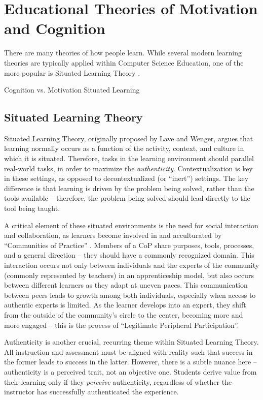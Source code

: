 \section{Educational Theories of Motivation and Cognition}

There are many theories of how people learn. 
While several modern learning theories are typically applied within Computer Science Education, one of the more popular is Situated Learning Theory \cite{ben2004situated}.

Cognition vs. Motivation
Situated Learning


\subsection{Situated Learning Theory}

Situated Learning Theory, originally proposed by Lave and Wenger, argues that learning normally occurs as a function of the activity, context, and culture in which it is situated\cite{lave-situated}.
Therefore, tasks in the learning environment should parallel real-world tasks, in order to maximize the \textit{authenticity}.
Contextualization is key in these settings, as opposed to decontextualized (or ``inert'') settings.
The key difference is that learning is driven by the problem being solved, rather than the tools available – therefore, the problem being solved should lead directly to the tool being taught.

A critical element of these situated environments is the need for social interaction and collaboration, as learners become involved in and acculturated by ``Communities of Practice'' \cite{brown1989situated}.
Members of a CoP share purposes, tools, processes, and a general direction -- they should have a commonly recognized domain. 
This interaction occurs not only between individuals and the experts of the community (commonly represented by teachers) in an apprenticeship model, but also occurs between different learners as they adapt at uneven paces.
This communication between peers leads to growth among both individuals, especially when access to authentic experts is limited.
As the learner develops into an expert, they shift from the outside of the community's circle to the center, becoming more and more engaged -- this is the process of ``Legitimate Peripheral Participation''.

Authenticity is another crucial, recurring theme within Situated Learning Theory.
All instruction and assessment must be aligned with reality such that success in the former leads to success in the latter.
However, there is a subtle nuance here -- authenticity is a perceived trait, not an objective one.
Students derive value from their learning only if they \textit{perceive} authenticity, regardless of whether the instructor has successfully authenticated the experience.

